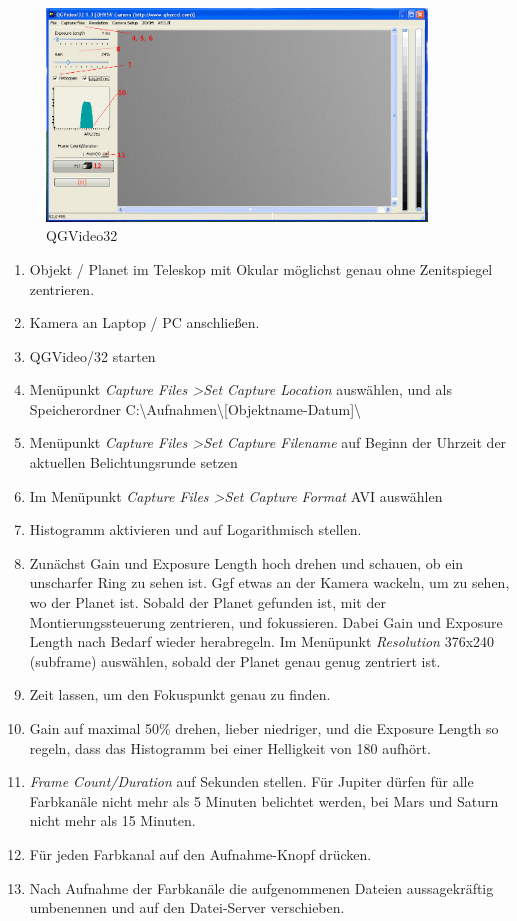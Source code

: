 \documentclass[10pt,a4paper,titlepage]{article}
\begin{document}
\begin{figure}[h!]
  \centering
    \includegraphics[width=0.9\textwidth]{QGVideo32-annotiert}
  \caption{QGVideo32}
  \label{fig:qgvideo32}
\end{figure}

\begin{enumerate} 
\item Objekt / Planet im Teleskop mit Okular möglichst genau ohne Zenitspiegel zentrieren.
\item Kamera an Laptop / PC anschließen.
\item QGVideo/32 starten
\item Menüpunkt \textit{Capture Files \textgreater Set Capture Location} auswählen, und als Speicherordner C:\textbackslash Aufnahmen\textbackslash [Objektname-Datum]\textbackslash
\item Menüpunkt \textit{Capture Files \textgreater Set Capture Filename} auf Beginn der Uhrzeit der aktuellen Belichtungsrunde setzen
\item Im Menüpunkt \textit{Capture Files \textgreater Set Capture Format} AVI auswählen
\item Histogramm aktivieren und auf Logarithmisch stellen.
\item Zunächst Gain und Exposure Length hoch drehen und schauen, ob ein unscharfer Ring zu sehen ist. Ggf etwas an der Kamera wackeln, um zu sehen, wo der Planet ist. Sobald der Planet gefunden ist, mit der Montierungssteuerung zentrieren, und fokussieren. Dabei Gain und Exposure Length nach Bedarf wieder herabregeln. Im Menüpunkt \textit{Resolution} 376x240 (subframe) auswählen, sobald der Planet genau genug zentriert ist.
\item Zeit lassen, um den Fokuspunkt genau zu finden.
\item Gain auf maximal 50\% drehen, lieber niedriger, und die Exposure Length so regeln, dass das Histogramm bei einer Helligkeit von 180 aufhört.
\item \textit{Frame Count/Duration} auf Sekunden stellen. Für Jupiter dürfen für alle Farbkanäle nicht mehr als 5 Minuten belichtet werden, bei Mars und Saturn nicht mehr als 15 Minuten.
\item Für jeden Farbkanal auf den Aufnahme-Knopf drücken.
\item Nach Aufnahme der Farbkanäle die aufgenommenen Dateien aussagekräftig umbenennen und auf den Datei-Server verschieben.
\end{enumerate}
\end{document}
